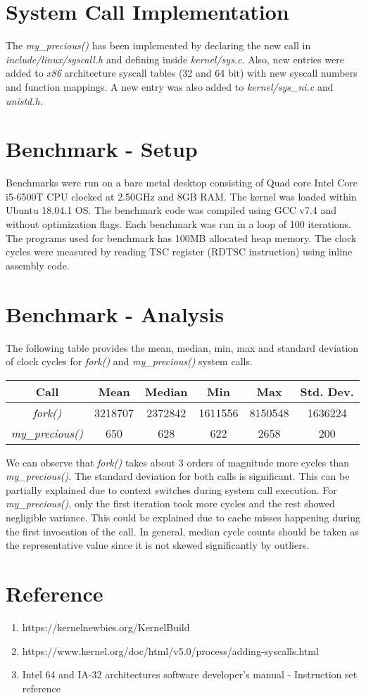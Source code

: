 \documentclass[12pt,letterpaper]{article}
\begin{document}
	
	\section{System Call Implementation}
	The \emph{my\_precious()} has been implemented by declaring the new call in \emph{include/linux/syscall.h} and defining inside \emph{kernel/sys.c}. Also, new entries were added to \emph{x86} architecture syscall tables (32 and 64 bit) with new syscall numbers and function mappings. A new entry was also added to \emph{kernel/sys\_ni.c} and \emph{unistd.h}.
	
	\section{Benchmark - Setup}
	Benchmarks were run on a bare metal desktop consisting of Quad core Intel Core i5-6500T CPU clocked at 2.50GHz and 8GB RAM. The kernel was loaded within Ubuntu 18.04.1 OS. The benchmark code was compiled using GCC v7.4 and without optimization flags. Each benchmark was run in a loop of 100 iterations. The programs used for benchmark has 100MB allocated heap memory. The clock cycles were measured by reading TSC register (RDTSC instruction) using inline assembly code.
		
	\section{Benchmark - Analysis}
	The following table provides the mean, median, min, max and standard deviation of clock cycles for \emph{fork()} and \emph{my\_precious()} system calls. \\
	
	\begin{center}
		\begin{tabular}{|c|c|c|c|c|c|}
			\hline
			\textbf{Call} & \textbf{Mean} & \textbf{Median} & \textbf{Min} & \textbf{Max} & \textbf{Std. Dev.} \\
			\hline 
			\emph{fork()} & 3218707 & 2372842 & 1611556 & 8150548 & 1636224 \\ 
			\hline 
			\emph{my\_precious()} & 650 & 628 & 622 & 2658 & 200 \\ 
			\hline 
		\end{tabular}		
	\end{center}
    
    We can observe that \emph{fork()} takes about 3 orders of magnitude more cycles than \emph{my\_precious()}. The standard deviation for both calls is significant. This can be partially explained due to context switches during system call execution. For \emph{my\_precious()}, only the first iteration took more cycles and the rest showed negligible variance. This could be explained due to cache misses happening during the first invocation of the call. In general, median cycle counts should be taken as the representative value since it is not skewed significantly by outliers. 
   	
	\section{Reference}
	\begin{enumerate}
		\item https://kernelnewbies.org/KernelBuild
		\item https://www.kernel.org/doc/html/v5.0/process/adding-syscalls.html
		\item Intel 64 and IA-32 architectures software developer's manual - Instruction set reference
	\end{enumerate}
\end{document}
